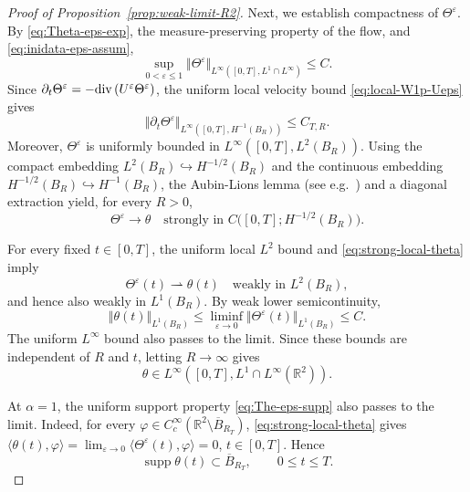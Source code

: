 \documentclass[reqno,11pt,a4paper]{amsart}
\renewcommand{\div}{{\rm div\,}}
\begin{document}
\begin{proof}[Proof of Proposition~\ref{prop:weak-limit-R2}]
Next, we establish compactness of $\Theta^\varepsilon$.
By \eqref{eq:Theta-eps-exp}, the measure-preserving
property of the flow, and \eqref{eq:inidata-eps-assum},
\begin{equation}\label{eq:The-eps-L1Linf-bdd}
  \sup_{0<\varepsilon\leq1}
  \Vert \Theta^\varepsilon\Vert _{L^\infty([0,T],L^1\cap L^\infty)}
  \leq C.
\end{equation}
Since
$\partial_t\Theta^\varepsilon
=-\div(U^\varepsilon\Theta^\varepsilon)$,
the uniform local velocity bound
\eqref{eq:local-W1p-Ueps} gives
\[
  \Vert \partial_t\Theta^\varepsilon
    \Vert _{L^\infty([0,T],H^{-1}(B_R))}
  \leq C_{T,R}.
\]
Moreover, $\Theta^\varepsilon$ is uniformly bounded
in $L^\infty([0,T],L^2(B_R))$.
Using the compact embedding
$L^2(B_R)\hookrightarrow H^{-1/2}(B_R)$
and the continuous embedding
$H^{-1/2}(B_R)\hookrightarrow H^{-1}(B_R)$,
the Aubin-Lions lemma
(see e.g.~\cite[Lemma~2.10]{LXY25})
and a diagonal extraction yield, for every $R>0$,
\begin{equation}\label{eq:strong-local-theta}
  \Theta^\varepsilon\longrightarrow\theta
  \quad\text{strongly in }
  C\bigl([0,T];H^{-1/2}(B_R)\bigr).
\end{equation}

For every fixed $t\in[0,T]$,
the uniform local $L^2$ bound and
\eqref{eq:strong-local-theta} imply
\[
  \Theta^\varepsilon(t)\rightharpoonup\theta(t)
  \quad\text{weakly in }L^2(B_R),
\]
and hence also weakly in $L^1(B_R)$.
By weak lower semicontinuity,
\[
  \Vert \theta(t)\Vert _{L^1(B_R)}
  \leq\liminf_{\varepsilon\to0}
    \Vert \Theta^\varepsilon(t)\Vert _{L^1(B_R)}
  \leq C.
\]
The uniform $L^\infty$ bound also passes to the limit.
Since these bounds are independent of $R$ and $t$,
letting $R\to\infty$ gives
\begin{equation}\label{eq:the-L1Linf-bdd}
  \theta\in
  L^\infty([0,T],L^1\cap L^\infty(\mathbb R^2)).
\end{equation}

At $\alpha=1$, the uniform support property
\eqref{eq:The-eps-supp} also passes to the limit.
Indeed, for every
$\varphi\in C_c^\infty(
\mathbb R^2\setminus\overline B_{R_T})$,
\eqref{eq:strong-local-theta} gives
$\langle\theta(t),\varphi\rangle = \lim_{\varepsilon\to0}
  \langle\Theta^\varepsilon(t),\varphi\rangle =0$,  
$t\in[0,T]$.
Hence
\begin{equation}\label{eq:the-supp-alp=1}
  \operatorname{supp}\theta(t)
  \subset\overline B_{R_T},
  \qquad 0\leq t\leq T.
\end{equation}


\end{proof}
\end{document}

